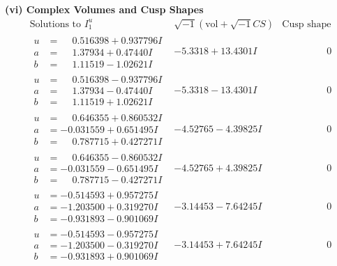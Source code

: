 \documentclass[1p]{elsarticle_modified}
\theoremstyle{definition}
\newcommand{\I}{\sqrt{-1}}
\begin{document}
\newpage\flushleft \textbf{(vi) Complex Volumes and Cusp Shapes}
$$\begin{array}{c|c|c}  
\text{Solutions to }I^u_{1}& \I (\text{vol} + \sqrt{-1}CS) & \text{Cusp shape}\\
 \hline 
\begin{aligned}
u &= \phantom{-}0.516398 + 0.937796 I \\
a &= \phantom{-}1.37934 + 0.47440 I \\
b &= \phantom{-}1.11519 - 1.02621 I\end{aligned}
 & -5.3318 + 13.4301 I & \phantom{-0.000000 } 0 \\ \hline\begin{aligned}
u &= \phantom{-}0.516398 - 0.937796 I \\
a &= \phantom{-}1.37934 - 0.47440 I \\
b &= \phantom{-}1.11519 + 1.02621 I\end{aligned}
 & -5.3318 - 13.4301 I & \phantom{-0.000000 } 0 \\ \hline\begin{aligned}
u &= \phantom{-}0.646355 + 0.860532 I \\
a &= -0.031559 + 0.651495 I \\
b &= \phantom{-}0.787715 + 0.427271 I\end{aligned}
 & -4.52765 - 4.39825 I & \phantom{-0.000000 } 0 \\ \hline\begin{aligned}
u &= \phantom{-}0.646355 - 0.860532 I \\
a &= -0.031559 - 0.651495 I \\
b &= \phantom{-}0.787715 - 0.427271 I\end{aligned}
 & -4.52765 + 4.39825 I & \phantom{-0.000000 } 0 \\ \hline\begin{aligned}
u &= -0.514593 + 0.957275 I \\
a &= -1.203500 + 0.319270 I \\
b &= -0.931893 - 0.901069 I\end{aligned}
 & -3.14453 - 7.64245 I & \phantom{-0.000000 } 0 \\ \hline\begin{aligned}
u &= -0.514593 - 0.957275 I \\
a &= -1.203500 - 0.319270 I \\
b &= -0.931893 + 0.901069 I\end{aligned}
 & -3.14453 + 7.64245 I & \phantom{-0.000000 } 0 \\ \hline\begin{aligned}

\end{aligned}
\end{array}$$
\end{document}
